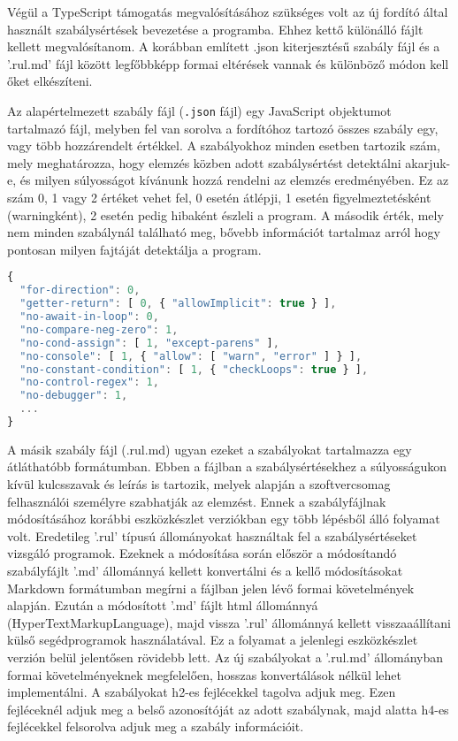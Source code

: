 Végül a TypeScript támogatás megvalósításához szükséges volt az új fordító által használt szabálysértések bevezetése a programba. Ehhez kettő különálló fájlt kellett megvalósítanom. A korábban említett .json kiterjesztésű szabály fájl és a '.rul.md' fájl között legfőbbképp formai eltérések vannak és különböző módon kell őket elkészíteni.

Az alapértelmezett szabály fájl (\texttt{.json} fájl) egy JavaScript objektumot tartalmazó fájl, melyben fel van sorolva a fordítóhoz tartozó összes szabály egy, vagy több hozzárendelt értékkel. A szabályokhoz minden esetben tartozik szám, mely meghatározza, hogy elemzés közben adott szabálysértést detektálni akarjuk-e, és milyen súlyosságot kívánunk hozzá rendelni az elemzés eredményében. Ez az szám 0, 1 vagy 2 értéket vehet fel, 0 esetén átlépji, 1 esetén figyelmeztetésként (warningként), 2 esetén pedig hibaként észleli a program. A második érték, mely nem minden szabálynál található meg, bővebb információt tartalmaz arról hogy pontosan milyen fajtáját detektálja a program. 

\begin{lstlisting}[caption={Szabálysértések megadása .json állományban},label={lst:jsonconfig}, language={JavaScript}]
{ 
  "for-direction": 0,
  "getter-return": [ 0, { "allowImplicit": true } ],
  "no-await-in-loop": 0,
  "no-compare-neg-zero": 1,
  "no-cond-assign": [ 1, "except-parens" ],
  "no-console": [ 1, { "allow": [ "warn", "error" ] } ],
  "no-constant-condition": [ 1, { "checkLoops": true } ],
  "no-control-regex": 1,
  "no-debugger": 1,
  ...
}
\end{lstlisting}

A másik szabály fájl (.rul.md) ugyan ezeket a szabályokat tartalmazza egy átláthatóbb formátumban. Ebben a fájlban a szabálysértésekhez a súlyosságukon kívül kulcsszavak és leírás is tartozik, melyek alapján a szoftvercsomag felhasználói személyre szabhatják az elemzést.
Ennek a szabályfájlnak módosításához korábbi eszközkészlet verziókban egy több lépésből álló folyamat volt. Eredetileg '.rul' típusú állományokat használtak fel a szabálysértéseket vizsgáló programok. Ezeknek a módosítása során először a módosítandó szabályfájlt '.md' állománnyá kellett konvertálni és a kellő módosításokat Markdown formátumban megírni a fájlban jelen lévő formai követelmények alapján. Ezután a módosított '.md' fájlt html állománnyá (HyperTextMarkupLanguage), majd vissza '.rul' állománnyá kellett visszaaállítani külső segédprogramok használatával.
Ez a folyamat a jelenlegi eszközkészlet verzión belül jelentősen rövidebb lett. Az új szabályokat a '.rul.md' állományban formai követelményeknek megfelelően, hosszas konvertálások nélkül lehet implementálni. A szabályokat h2-es fejlécekkel tagolva adjuk meg. Ezen fejléceknél adjuk meg a belső azonosítóját az adott szabálynak, majd alatta h4-es fejlécekkel felsorolva adjuk meg a szabály információit. 

